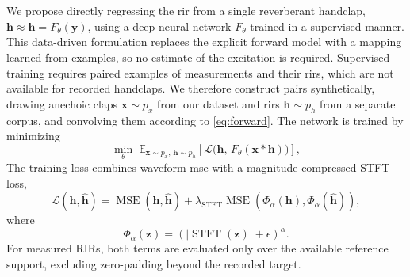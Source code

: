 \documentclass{article}
\begin{document}
We propose directly regressing the \ac{rir} from a single reverberant
handclap, $\mathbf{h}\approx \widehat{\mathbf{h}} = F_{\theta}(\mathbf{y})$, using a deep neural network $F_{\theta}$ trained in a supervised manner.
This data-driven formulation replaces the explicit forward model with a mapping learned from examples, so no estimate of the excitation is required.
Supervised training requires paired examples of measurements and their \acp{rir}, which are not available for recorded handclaps. We therefore construct pairs synthetically, drawing anechoic claps $\mathbf{x} \sim p_x$ from our dataset and \acp{rir} $\mathbf{h} \sim p_h$ from a separate corpus, and convolving them according to \eqref{eq:forward}.
The network is trained by minimizing
\begin{equation}
    \min_{\theta} \;
    \mathbb{E}_{\mathbf{x} \sim p_x, \, \mathbf{h} \sim p_h}
    \left[
        \mathcal{L} \big( \mathbf{h}, \, F_{\theta}(\mathbf{x} \ast \mathbf{h}) \big)
    \right],
    \label{eq:objective}
\end{equation}
The training loss combines waveform \ac{mse} with a magnitude-compressed STFT
loss,
\begin{equation}
\mathcal{L}(\mathbf{h},\widehat{\mathbf{h}})
=
\operatorname{MSE}\!\left(\mathbf{h},\widehat{\mathbf{h}}\right)
+
\lambda_{\mathrm{STFT}}
\operatorname{MSE}\!\left(
\Phi_{\alpha}(\mathbf{h}),
\Phi_{\alpha}(\widehat{\mathbf{h}})
\right),
\label{eq:loss}
\end{equation}
where
\[
\Phi_{\alpha}(\mathbf{z})
=
\left(
|\operatorname{STFT}(\mathbf{z})|+\epsilon
\right)^{\alpha}.
\]
For measured RIRs, both terms are evaluated only over the available
reference support, excluding zero-padding beyond the recorded target.

\end{document}
